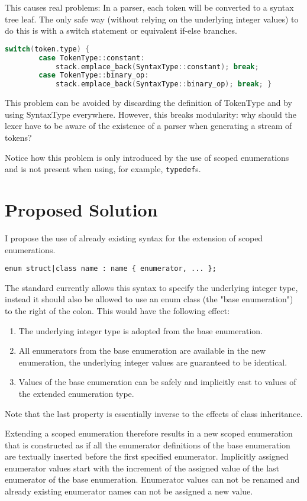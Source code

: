 \documentclass{scrartcl}
\begin{document}
\noindent
This causes real problems: In a parser, each token will be converted to a syntax tree leaf.
The only safe way (without relying on the underlying integer values) to do this is with a switch statement or equivalent if-else branches.

\begin{lstlisting}[language=C++]
    switch(token.type) {
        case TokenType::constant: 
            stack.emplace_back(SyntaxType::constant); break;
        case TokenType::binary_op:
            stack.emplace_back(SyntaxType::binary_op); break; }
\end{lstlisting}
\noindent
This problem can be avoided by discarding the definition of TokenType and by using SyntaxType everywhere.
However, this breaks modularity: why should the lexer have to be aware of the existence of a parser when generating a stream of tokens?

Notice how this problem is only introduced by the use of scoped enumerations and is not present when using, for example, \texttt{typedef}s.

\section{Proposed Solution}
I propose the use of already existing syntax for the extension of scoped enumerations.

\begin{lstlisting}[language={}]
    enum struct|class name : name { enumerator, ... };
\end{lstlisting}

\noindent
The standard currently allows this syntax to specify the underlying integer type, instead it should also be allowed to use an enum class (the "base enumeration") to the right of the colon.
This would have the following effect:
\begin{enumerate}
\item The underlying integer type is adopted from the base enumeration.
\item All enumerators from the base enumeration are available in the new enumeration, the underlying integer values are guaranteed to be identical.
\item Values of the base enumeration can be safely and implicitly cast to values of the extended enumeration type.
\end{enumerate}
Note that the last property is essentially inverse to the effects of class inheritance.

Extending a scoped enumeration therefore results in a new scoped enumeration that is constructed as if all the enumerator definitions of the base enumeration are textually inserted before the first specified enumerator.
Implicitly assigned enumerator values start with the increment of the assigned value of the last enumerator of the base enumeration.
Enumerator values can not be renamed and already existing enumerator names can not be assigned a new value.
\end{document}
